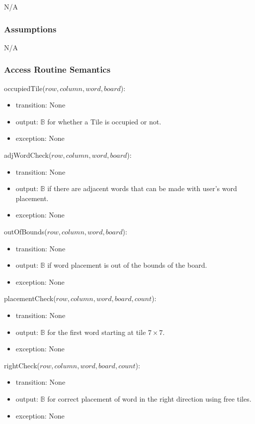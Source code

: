 \documentclass[12pt]{article}
\begin{document}
N/A

\subsubsection*{Assumptions}

N/A

\subsubsection* {Access Routine Semantics}

\noindent occupiedTile($row, column, word, board$):
\begin{itemize}
\item transition: None
\item output: $\mathbb{B}$ for whether a Tile is occupied or not.
\item exception: None
\end{itemize}

\noindent adjWordCheck($row, column, word, board$):
\begin{itemize}
\item transition: None
\item output: $\mathbb{B}$ if there are adjacent words that can be made with user's word placement.
\item exception: None
\end{itemize}

\noindent outOfBounds($row, column, word, board$):
\begin{itemize}
\item transition: None
\item output: $\mathbb{B}$ if word placement is out of the bounds of the board.
\item exception: None
\end{itemize}

\noindent placementCheck($row, column, word, board, count$):
\begin{itemize}
\item transition: None
\item output: $\mathbb{B}$ for the first word starting at tile $7\times7$.
\item exception: None
\end{itemize}

\noindent rightCheck($row, column, word, board, count$):
\begin{itemize}
\item transition: None
\item output: $\mathbb{B}$ for correct placement of word in the right direction using free tiles.
\item exception: None
\end{itemize}
\end{document}

